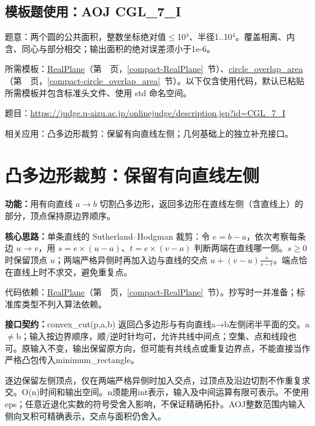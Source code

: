 

\Needspace{249pt}

\subsection*{模板题使用：AOJ CGL\_7\_I}

\label{usage-example-154}

题意：两个圆的公共面积，整数坐标绝对值$\le$10$^{4}$、半径1..10$^{4}$。覆盖相离、内含、同心与部分相交；输出面积的绝对误差须小于1e-6。

所需模板：\hyperref[compact-RealPlane]{RealPlane}（第~\pageref{compact-RealPlane}~页，\ref{compact-RealPlane}~节）、\hyperref[compact-circle_overlap_area]{circle\_\allowbreak{}overlap\_\allowbreak{}area}（第~\pageref{compact-circle_overlap_area}~页，\ref{compact-circle_overlap_area}~节）。以下仅含使用代码，默认已粘贴所需模板并包含标准头文件、使用 std 命名空间。

题目：\url{https://judge.u-aizu.ac.jp/onlinejudge/description.jsp?id=CGL_7_I}



\newpage

\Needspace{412pt}

\noindent 相关应用：凸多边形裁剪：保留有向直线左侧；几何基础上的独立补充接口。

\section{凸多边形裁剪：保留有向直线左侧}\label{compact-convex_cut}

\noindent\textbf{功能：}\allowbreak 用有向直线 $a\to b$ 切割凸多边形，返回多边形在直线左侧（含直线上）的部分，顶点保持原边界顺序。

\textbf{核心思路：}\allowbreak 单条直线的 Sutherland--Hodgman 裁剪：令 $e=b-a$，依次考察每条边 $u\to v$，用 $s=e\times(u-a)$、$t=e\times(v-a)$ 判断两端在直线哪一侧。$s\ge0$ 时保留顶点 $u$；两端严格异侧时再加入边与直线的交点 $u+(v-u)\frac{s}{s-t}$。端点恰在直线上时不求交，避免重复点。

代码依赖：\hyperref[compact-RealPlane]{RealPlane}（第~\pageref{compact-RealPlane}~页，\ref{compact-RealPlane}~节）。抄写时一并准备；标准库类型不列入算法依赖。

{\sloppy{}\noindent\textbf{接口契约：}convex\_cut(p,a,b) 返回凸多边形与有向直线a→b左侧闭半平面的交。a$\ne$b；输入按边界顺序，顺/逆时针均可，允许共线中间点；空集、点和线段也可。原输入不变，输出保留原方向，但可能有共线点或重复边界点，不能直接当作严格凸包传入minimum\_rectangle。

逐边保留左侧顶点，仅在两端严格异侧时加入交点，过顶点及沿边切割不作重复求交。O(n)时间和输出空间。n须能用int表示，输入及中间运算有限可表示。不使用eps；任意近退化实数的符号受舍入影响，不保证精确拓扑。AOJ整数范围内输入侧向叉积可精确表示，交点与面积仍舍入。\par}

